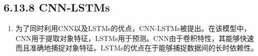 
\subsection{6.13.8 CNN-LSTMs}\label{cnn-lstms}

\begin{enumerate}
\def\labelenumi{\arabic{enumi}.}
\item
  为了同时利用CNN以及LSTMs的优点，CNN-LSTMs被提出。在该模型中，CNN用于提取对象特征，LSTMs用于预测。CNN由于卷积特性，其能够快速而且准确地捕捉对象特征。LSTMs的优点在于能够捕捉数据间的长时依赖性。
\end{enumerate}











